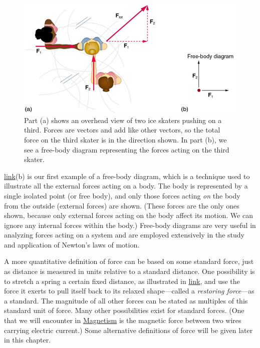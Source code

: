 \documentclass[
]{book}
\begin{document}
\begin{figure}
\hypertarget{import-auto-id2379809}{%
\centering
\includegraphics{images/Figure 04_01_01.jpg}
\caption{Part (a) shows an overhead view of two ice skaters pushing on a third.
Forces are vectors and add like other vectors, so the total force on the
third skater is in the direction shown. In part (b), we see a free-body
diagram representing the forces acting on the third
skater.}\label{import-auto-id2379809}
}
\end{figure}

\protect\hyperlink{import-auto-id2379809}{link}(b) is our first
example of a \protect\hypertarget{import-auto-id1590568}{}{free-body diagram}, which is a technique used to illustrate all the
\protect\hypertarget{import-auto-id1608860}{}{external forces} acting on a
body. The body is represented by a single isolated point (or free body),
and only those forces acting \emph{on} the body from the outside (external
forces) are shown. (These forces are the only ones shown, because only
external forces acting on the body affect its motion. We can ignore any
internal forces within the body.) Free-body diagrams are very useful in
analyzing forces acting on a system and are employed extensively in the
study and application of Newton's laws of motion.

A more quantitative definition of force can be based on some standard
force, just as distance is measured in units relative to a standard
distance. One possibility is to stretch a spring a certain fixed
distance, as illustrated in
\protect\hyperlink{import-auto-id2608835}{link}, and use the
force it exerts to pull itself back to its relaxed shape---called a
\emph{restoring force}---as a standard. The magnitude of all other forces can
be stated as multiples of this standard unit of force. Many other
possibilities exist for standard forces. (One that we will encounter in
\href{/m55373}{Magnetism} is the magnetic force between two wires carrying
electric current.) Some alternative definitions of force will be given
later in this chapter.
\end{document}
